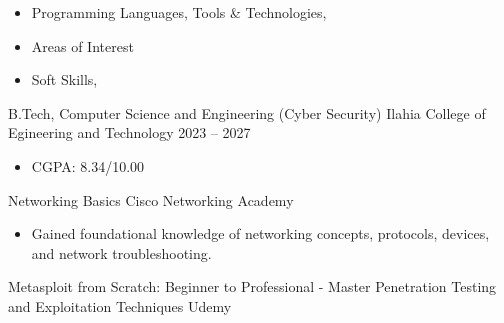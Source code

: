 \begin{itemize}
    \item Programming Languages, Tools \& Technologies, \newline 
        
    \divider

    \item Areas of Interest \newline
        
    \divider
        
    \item Soft Skills, \newline
    \end{itemize}


\cvevent
    {B.Tech, Computer Science and Engineering (Cyber Security)}
    {Ilahia College of Egineering and Technology}
    {2023 -- 2027}
    {}
    \begin{itemize}
        \item CGPA: 8.34/10.00
    \end{itemize}
    

\cvcred
    {Networking Basics}
    {Cisco Networking Academy}

    \begin{itemize}
        \item Gained foundational knowledge of networking concepts, protocols, devices, and network troubleshooting.
    \end{itemize}
\divider

\cvcred
    {Metasploit from Scratch: Beginner to Professional - Master Penetration Testing and Exploitation Techniques}
    {Udemy}

